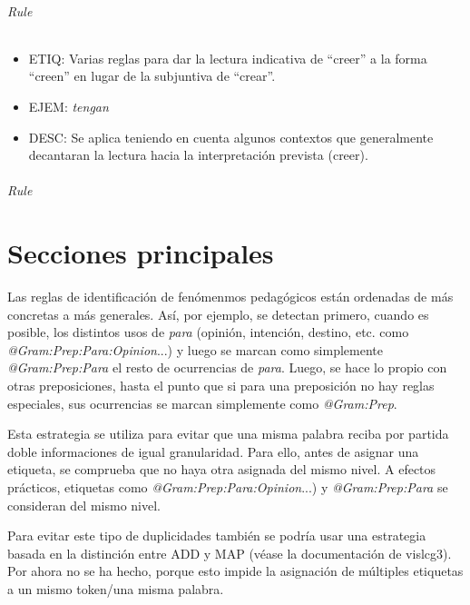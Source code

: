 \documentclass[11pt]{report}
\begin{document}
\paragraph*{Rule}
\begin{itemize}
\item ETIQ: Varias reglas para dar la lectura indicativa de ``creer'' a la forma ``creen'' en lugar de la subjuntiva de ``crear''. 
\item EJEM: \emph{tengan} 
\item DESC: Se aplica teniendo en cuenta algunos contextos que generalmente decantaran la lectura hacia la interpretación prevista (creer).
\end{itemize}

\paragraph*{Rule}
\part{Secciones principales}
Las reglas de identificación de fenómenmos pedagógicos están ordenadas de más concretas a más generales. Así, por ejemplo, se detectan primero, cuando es posible, los distintos usos de \emph{para} (opinión, intención, destino, etc. como \emph{@Gram:Prep:Para:Opinion}...) y luego se marcan como simplemente \emph{@Gram:Prep:Para} el resto de ocurrencias de \emph{para}. Luego, se hace lo propio con otras preposiciones, hasta el punto que si para una preposición no hay reglas especiales, sus ocurrencias se marcan simplemente como \emph{@Gram:Prep}.

Esta estrategia se utiliza para evitar que una misma palabra reciba por partida doble informaciones de igual granularidad. Para ello, antes de asignar una etiqueta, se comprueba que no haya otra asignada del mismo nivel. A efectos prácticos, etiquetas como \emph{@Gram:Prep:Para:Opinion}...) y \emph{@Gram:Prep:Para} se consideran del mismo nivel.

Para evitar este tipo de duplicidades también se podría usar una estrategia basada en la distinción entre ADD y MAP (véase la documentación de vislcg3). Por ahora no se ha hecho, porque esto impide la asignación de múltiples etiquetas a un mismo token/una misma palabra.
\end{document}
